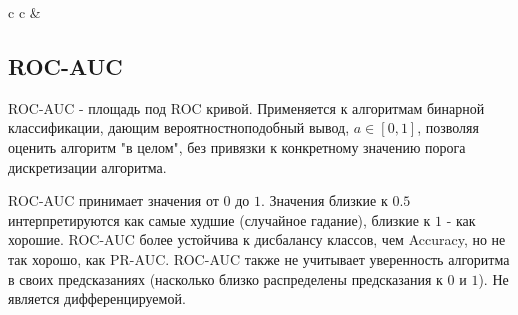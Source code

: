 \begin{tabular}{ c c }
    & 
\end{tabular}

\subsection{ROC-AUC}

ROC-AUC - площадь под ROC кривой. Применяется к алгоритмам бинарной классификации, дающим вероятностноподобный вывод, $a\in[0, 1]$, позволяя оценить алгоритм "в целом", без привязки к конкретному значению порога дискретизации алгоритма.

ROC-AUC принимает значения от $0$ до $1$. Значения близкие к $0.5$ интерпретируются как самые худшие (случайное гадание), близкие к $1$ - как хорошие. ROC-AUC более устойчива к дисбалансу классов, чем Accuracy, но не так хорошо, как PR-AUC. ROC-AUC также не учитывает уверенность алгоритма в своих предсказаниях (насколько близко распределены предсказания к $0$ и $1$). Не является дифференцируемой.

